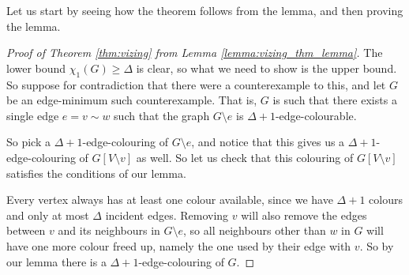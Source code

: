 \documentclass[nobib]{tufte-handout}
\begin{document}
Let us start by seeing how the theorem follows from the lemma, and then proving the lemma.

\begin{proof}[Proof of Theorem \ref{thm:vizing} from Lemma \ref{lemma:vizing_thm_lemma}]
  The lower bound $\chi_1(G) \geq \Delta$ is clear, so what we need to show is the upper bound. So suppose for contradiction that there were a counterexample to this, and let $G$ be an edge-minimum such counterexample. That is, $G$ is such that there exists a single edge $e = v \sim w$ such that the graph $G \setminus e$ is $\Delta+1$-edge-colourable. 
  
  So pick a $\Delta+1$-edge-colouring of $G \setminus e$, and notice that this gives us a $\Delta+1$-edge-colouring of $G[V \setminus v]$ as well. So let us check that this colouring of $G[V \setminus v]$ satisfies the conditions of our lemma.
  
  Every vertex always has at least one colour available, since we have $\Delta+1$ colours and only at most $\Delta$ incident edges. Removing $v$ will also remove the edges between $v$ and its neighbours in $G \setminus e$, so all neighbours other than $w$ in $G$ will have one more colour freed up, namely the one used by their edge with $v$. So by our lemma there is a $\Delta + 1$-edge-colouring of $G$.
\end{proof}
\end{document}
